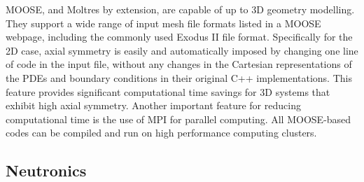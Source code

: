 \gls{MOOSE}, and Moltres by extension, are capable of up to 3D geometry
modelling. They support a wide range of input mesh file formats listed in a
\gls{MOOSE} webpage, including the commonly used Exodus II file format.
Specifically for the 2D case, axial symmetry is easily and automatically
imposed by changing one line of code in the input file, without any changes in
the Cartesian representations of the \glspl{PDE} and boundary conditions in
their original C++ implementations. This feature provides significant
computational time savings for 3D systems that exhibit high axial symmetry.
Another important feature for reducing computational time is the use of MPI
for parallel computing. All \gls{MOOSE}-based codes can be compiled and
run on high performance computing clusters.

\subsection{Neutronics}

